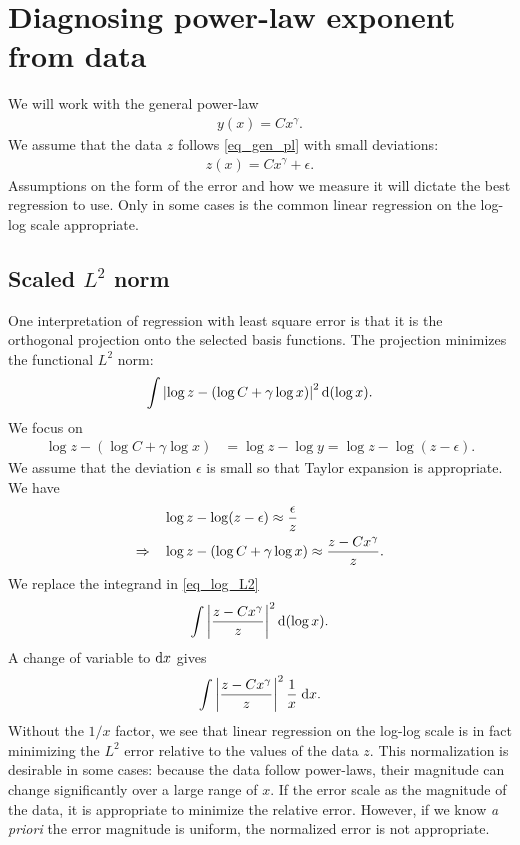 \documentclass[11pt,letterpaper]{article}
\begin{document}
\section{Diagnosing power-law exponent from data}\label{sec_linreg_log}
We will work with the general power-law
\begin{align}
    y(x) = Cx^\gamma.\label{eq_gen_pl}
\end{align}
We assume that the data $z$ follows \eqref{eq_gen_pl} with small deviations: 
\begin{align}
    z(x) = Cx^\gamma + \epsilon.\label{eq_data_pl}
\end{align}
Assumptions on the form of the error and how we measure it will dictate the best regression to use. Only in some cases is the common linear regression on the log-log scale appropriate. 

\subsection{Scaled $L^2$ norm}\label{sec_scale_L2}
One interpretation of regression with least square error is that it is the orthogonal projection onto the selected basis functions. The projection minimizes the functional $L^2$ norm:
\begin{align}
    \int \left| \log z- (\log C+\gamma \log x) \right|^2 \mathrm{d}(\log x).\label{eq_log_L2}
\end{align}
We focus on
\begin{align}
    \log z- (\log C+\gamma \log x) &= \log z- \log y = \log z- \log (z-\epsilon).
\end{align}
We assume that the deviation $\epsilon$ is small so that Taylor expansion is appropriate. We have
\begin{align}
    &\log z- \log (z-\epsilon) \approx \frac{\epsilon}{z}\\
    \Rightarrow \quad &\log z- (\log C+\gamma \log x) \approx \frac{z-Cx^\gamma}{z}.
\end{align}
We replace the integrand in \eqref{eq_log_L2} 
\begin{align}
    \int \left|\frac{z-Cx^\gamma}{z}\right|^2 \mathrm{d}(\log x).
\end{align}
A change of variable to $\mathrm{d} x$ gives
\begin{align}
    \int \left|\frac{z-Cx^\gamma}{z}\right|^2 \frac{1}{x} \;\mathrm{d} x.\label{eq_L2_scale1/x}
\end{align}
Without the $1/x$ factor, we see that linear regression on the log-log scale is in fact minimizing the $L^2$ error relative to the values of the data $z$. This normalization is desirable in some cases: because the data follow power-laws, their magnitude can change significantly over a large range of $x$. If the error scale as the magnitude of the data, it is appropriate to minimize the relative error. However, if we know \textit{a priori} the error magnitude is uniform, the normalized error is not appropriate.
\end{document}
